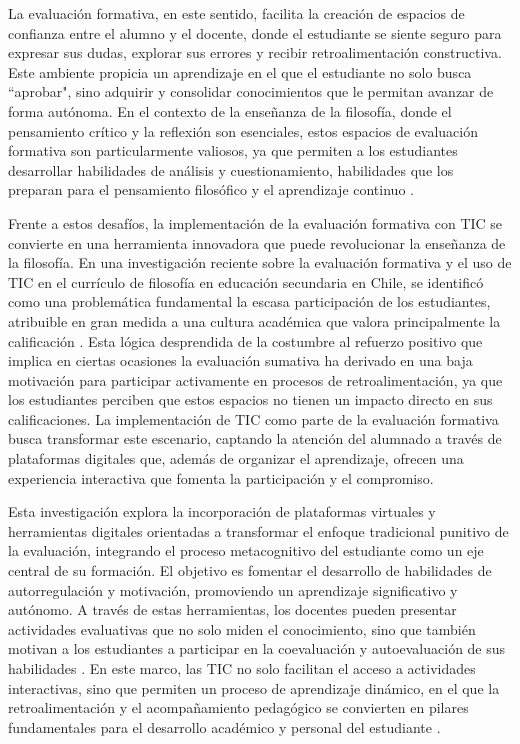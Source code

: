 \documentclass[spanish]{textolivre}
\begin{document}
La evaluación formativa, en este sentido, facilita la creación de espacios de confianza entre el alumno y el docente, donde el estudiante se siente seguro para expresar sus dudas, explorar sus errores y recibir retroalimentación constructiva. Este ambiente propicia un aprendizaje en el que el estudiante no solo busca ``aprobar", sino adquirir y consolidar conocimientos que le permitan avanzar de forma autónoma. En el contexto de la enseñanza de la filosofía, donde el pensamiento crítico y la reflexión son esenciales, estos espacios de evaluación formativa son particularmente valiosos, ya que permiten a los estudiantes desarrollar habilidades de análisis y cuestionamiento, habilidades que los preparan para el pensamiento filosófico y el aprendizaje continuo \cite{galarza-salazar2021}.

Frente a estos desafíos, la implementación de la evaluación formativa con TIC se convierte en una herramienta innovadora que puede revolucionar la enseñanza de la filosofía. En una investigación reciente sobre la evaluación formativa y el uso de TIC en el currículo de filosofía en educación secundaria en Chile, se identificó como una problemática fundamental la escasa participación de los estudiantes, atribuible en gran medida a una cultura académica que valora principalmente la calificación \cite{lombardo-bertolini2024}. Esta lógica desprendida de la costumbre al refuerzo positivo que implica en ciertas ocasiones la evaluación sumativa ha derivado en una baja motivación para participar activamente en procesos de retroalimentación, ya que los estudiantes perciben que estos espacios no tienen un impacto directo en sus calificaciones. La implementación de TIC como parte de la evaluación formativa busca transformar este escenario, captando la atención del alumnado a través de plataformas digitales que, además de organizar el aprendizaje, ofrecen una experiencia interactiva que fomenta la participación y el compromiso.

Esta investigación explora la incorporación de plataformas virtuales y herramientas digitales orientadas a transformar el enfoque tradicional punitivo de la evaluación, integrando el proceso metacognitivo del estudiante como un eje central de su formación. El objetivo es fomentar el desarrollo de habilidades de autorregulación y motivación, promoviendo un aprendizaje significativo y autónomo. A través de estas herramientas, los docentes pueden presentar actividades evaluativas que no solo miden el conocimiento, sino que también motivan a los estudiantes a participar en la coevaluación y autoevaluación de sus habilidades \cite{mendoza2020}. En este marco, las TIC no solo facilitan el acceso a actividades interactivas, sino que permiten un proceso de aprendizaje dinámico, en el que la retroalimentación y el acompañamiento pedagógico se convierten en pilares fundamentales para el desarrollo académico y personal del estudiante \cite{lopez-pastor2011}.
\end{document}
